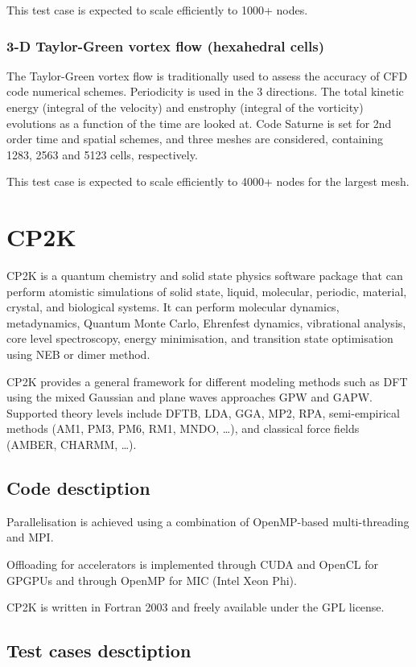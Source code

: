This test case is expected to scale efficiently to 1000+ nodes.

\subsubsection{3-D Taylor-Green vortex flow (hexahedral cells)}
The Taylor-Green vortex flow is traditionally used to assess the accuracy of CFD code numerical schemes. Periodicity is used in the 3 directions. The total kinetic energy (integral of the velocity) and enstrophy (integral of the vorticity) evolutions as a function of the time are looked at. Code Saturne is set for 2nd order time and spatial schemes, and three meshes are considered, containing 1283, 2563 and 5123 cells, respectively.

This test case is expected to scale efficiently to 4000+ nodes for the largest mesh.

\section{CP2K}
CP2K is a quantum chemistry and solid state physics software package that can perform atomistic simulations of solid state, liquid, molecular, periodic, material, crystal, and biological systems. It can perform molecular dynamics, metadynamics, Quantum Monte Carlo, Ehrenfest dynamics, vibrational analysis, core level spectroscopy, energy minimisation, and transition state optimisation using NEB or dimer method.

CP2K provides a general framework for different modeling methods such as DFT using the mixed Gaussian and plane waves approaches GPW and GAPW. Supported theory levels include DFTB, LDA, GGA, MP2, RPA, semi-empirical methods (AM1, PM3, PM6, RM1, MNDO, …), and classical force fields (AMBER, CHARMM, …).

\subsection{Code desctiption}
Parallelisation is achieved using a combination of OpenMP-based multi-threading and MPI.

Offloading for accelerators is implemented through CUDA and OpenCL for GPGPUs and through OpenMP for MIC (Intel Xeon Phi).

CP2K is written in Fortran 2003 and freely available under the GPL license.

\subsection{Test cases desctiption}
